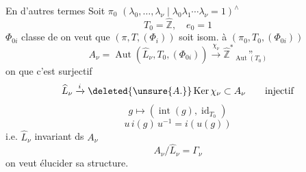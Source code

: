 En d'autres termes
Soit $\pi_0$  
$(\lambda_0,\ldots,\lambda_\nu\mid\lambda_0\lambda_1\cdots\lambda_\nu=1)^{\wedge}$
\[
T_0=\widehat{\mathbb Z},\quad e_0=1
\]
$\Phi_{0i}$ classe de
on veut que $(\pi,T,(\Phi_i))$ soit isom. à $(\pi_0,T_0,(\Phi_{0i}))$
\[
A_\nu=\operatorname{Aut}(\widehat L_\nu,T_0,(\Phi_{0i}))
\xrightarrow{\chi_\nu}\widehat{\mathbb Z}^{*}
\underset{\operatorname{Aut}(T_0)}{\text{''}}
\]
on  que c'est surjectif
\[
\widehat L_\nu\xrightarrow{i}\deleted{\unsure{A.}}\operatorname{Ker}\chi_\nu\subset A_\nu
\qquad\text{injectif}
\]
\[
g\longmapsto(\operatorname{int}(g),\operatorname{id}_{T_0})
\]
\[
u\,i(g)\,u^{-1}=i(u(g))
\]
i.e. $\widehat L_\nu$ invariant ds $A_\nu$
\[
A_\nu/\widehat L_\nu=\Gamma_\nu
\]
on veut élucider sa structure.
